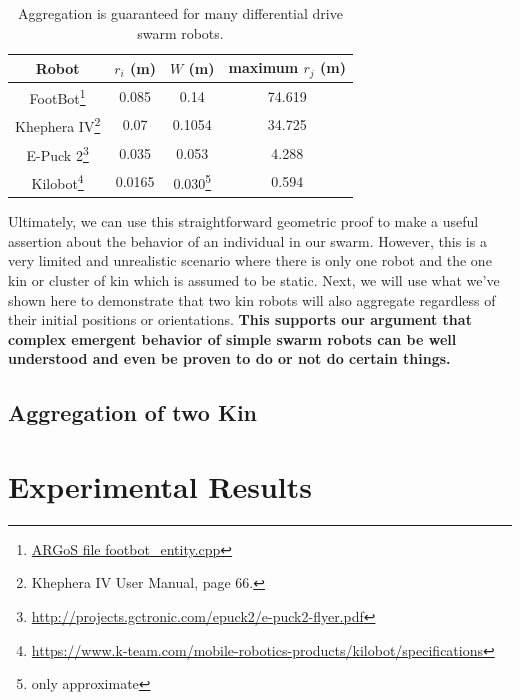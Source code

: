 \documentclass[conference]{IEEEtran}
\begin{document}
    \begin{savenotes}
    \begin{table}
      \centering
      \caption{Aggregation is guaranteed for many differential drive swarm robots.}
      \begin{tabular}{|c|c|c|c|} \hline
        Robot & $r_i$ (m) & $W$ (m) & maximum $r_j$ (m) \\ \hline
        FootBot\footnote{\href{https://github.com/ilpincy/argos3/blob/master/src/plugins/robots/foot-bot/simulator/footbot_entity.cpp}{ARGoS file footbot\_entity.cpp}} &
            0.085 & 0.14 & 74.619 \\ \hline
        Khephera IV\footnote{Khephera IV User Manual, page 66.} &
            0.07 & 0.1054 & 34.725 \\ \hline
        E-Puck 2\footnote{\href{http://projects.gctronic.com/epuck2/e-puck2-flyer.pdf}{http://projects.gctronic.com/epuck2/e-puck2-flyer.pdf}} &
            0.035 & 0.053 & 4.288 \\ \hline
        Kilobot\footnote{\href{https://www.k-team.com/mobile-robotics-products/kilobot/specifications}{https://www.k-team.com/mobile-robotics-products/kilobot/specifications}} &
            0.0165 & 0.030\footnote{only approximate} & 0.594 \\ \hline
      \end{tabular}
      \label{table:robots}
    \end{table}
    \end{savenotes}

    Ultimately, we can use this straightforward geometric proof to make a useful assertion about the behavior of an individual in our swarm. However, this is a very limited and unrealistic scenario where there is only one robot and the one kin or cluster of kin which is assumed to be static. Next, we will use what we've shown here to demonstrate that two kin robots will also aggregate regardless of their initial positions or orientations. \textbf{This supports our argument that complex emergent behavior of simple swarm robots can be well understood and even be proven to do or not do certain things.}


  \subsection{Aggregation of two Kin}

\section{Experimental Results}
\end{document}
